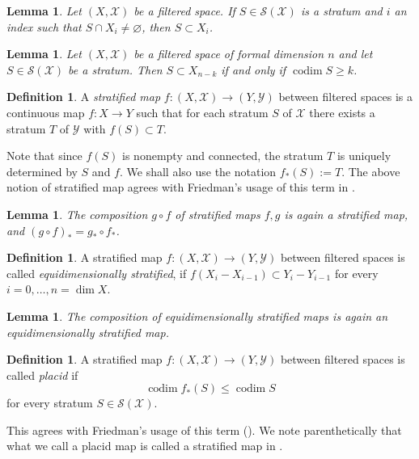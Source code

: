 \documentclass{amsart}
\newtheorem{lemma}[thm]{Lemma}
\theoremstyle{definition}
\newtheorem{defn}[thm]{Definition}
\theoremstyle{remark}
\newcommand {\Sa}    {\ensuremath{\mbox{$\mathcal{S}$}}}
\newcommand {\Xa}    {\ensuremath{\mathcal{X}}}
\newcommand {\Ya}    {\ensuremath{\mathcal{Y}}}
\newcommand {\codim} {\ensuremath{\operatorname{codim}}}
\begin{document}
\begin{lemma} \label{lem.stratumnontrivintiscontained}
Let $(X,\Xa)$ be a filtered space.
If $S \in \Sa (\Xa)$ is a stratum and $i$ an index such that
$S \cap X_i \not= \varnothing$, then
$S \subset X_i$.
\end{lemma}

\begin{lemma} \label{lem.stratumcontainedimpliescodiminequ}
Let $(X,\Xa)$ be a filtered space of formal dimension $n$ and
let $S \in \Sa (\Xa)$ be a stratum. Then 
$S\subset X_{n-k}$ if and only if $\codim S \geq k$.
\end{lemma}

\begin{defn} \label{def.stratifiedmap}
A \emph{stratified map} $f:(X,\Xa) \to (Y,\Ya)$ between filtered spaces
is a continuous map $f:X\to Y$ such that for each stratum $S$ of $\Xa$
there exists a stratum $T$ of $\Ya$ with 
$f(S) \subset T.$
\end{defn} 
Note that since $f(S)$ is nonempty and connected, the
stratum $T$ is uniquely determined by $S$ and $f$. We shall
also use the notation $f_* (S) := T$.
The above notion of stratified map agrees with Friedman's usage
of this term in \cite[Def. 2.9.1]{friedmanihbook}.

\begin{lemma} \label{lem.compstratmapsisstratmap}
The composition $g\circ f$ of stratified maps $f,g$ is again a stratified map,
and $(g\circ f)_* = g_* \circ f_*$.
\end{lemma}

\begin{defn}
A stratified map $f:(X,\Xa) \to (Y,\Ya)$ between filtered spaces
is called \emph{equidimensionally stratified}, if 
$f(X_i - X_{i-1}) \subset Y_i - Y_{i-1}$ for every $i=0,\ldots, n=\dim X$.
\end{defn}

\begin{lemma} \label{lem.compequstratmapsisequstratmap}
The composition of equidimensionally stratified maps
is again an equidimensionally stratified map.
\end{lemma}

\begin{defn} \label{def.placidmap}
A stratified map $f:(X,\Xa) \to (Y,\Ya)$ between filtered spaces
is called \emph{placid} if 
\[ \codim f_* (S) \leq \codim S \]
for every stratum $S\in \Sa (\Xa)$.
\end{defn}
This agrees with Friedman's usage of this term (\cite[Example 4.1.5]{friedmanihbook}).
We note parenthetically that what we
call a placid map is called a stratified map in \cite{chataurst}.
\end{document}
